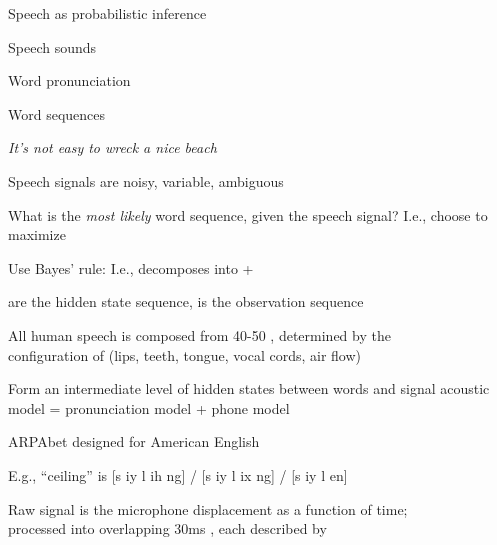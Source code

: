 \documentclass{article}
\begin{document}
\begin{huge}

\sf


\blob Speech as probabilistic inference

\blob Speech sounds

\blob Word pronunciation

\blob Word sequences



\emph{It's not easy to wreck a nice beach}

Speech signals are noisy, variable, ambiguous

What is the \emph{most likely} word sequence, given the speech signal?\al
I.e., choose  to maximize 

Use Bayes' rule:
\mat{\[
P(Words|signal) = \alpha P(signal|Words) P(Words)
\]}%
I.e., decomposes into  + 

 are the hidden state sequence,  is the observation sequence


All human speech is composed from 40-50 , determined by the\\
configuration of  (lips, teeth, tongue, vocal cords, air flow)

Form an intermediate level of hidden states between words and signal\nl
  \mat{$\Rightarrow$} acoustic model = pronunciation model + phone model

ARPAbet designed for American English



E.g., ``ceiling'' is [s iy l ih ng] / [s iy l ix ng] / [s iy l en]



Raw signal is the microphone displacement as a function of time;\\
processed into overlapping 30ms , each described by 


\end{huge}
\end{document}
